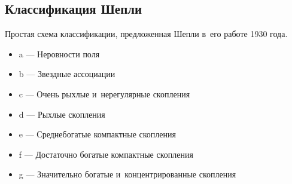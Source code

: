 \documentclass{beamer}
\begin{document}
    \subsection{Классификация Шепли}
    \begin{frame}
        Простая схема классификации, предложенная Шепли в~его работе 1930 года\cite{ShapleyClass}.
        \begin{itemize}
        \item a --- Неровности поля
        \item b --- Звездные ассоциации
        \item c --- Очень рыхлые и~нерегулярные скопления
        \item d --- Рыхлые скопления
        \item e --- Среднебогатые компактные скопления
        \item f --- Достаточно богатые компактные скопления
        \item g --- Значительно богатые и~концентрированные скопления
        \end{itemize}
    \end{frame}
\end{document}
